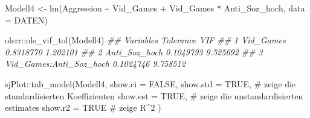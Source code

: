\documentclass[
  10pt,
  letterpaper,
  a4paper, twoside]{scrreprt}
\newenvironment{Shaded}{\begin{snugshade}}{\end{snugshade}}
\newcommand{\AttributeTok}[1]{\textcolor[rgb]{0.40,0.45,0.13}{#1}}
\newcommand{\CommentTok}[1]{\textcolor[rgb]{0.37,0.37,0.37}{#1}}
\newcommand{\ConstantTok}[1]{\textcolor[rgb]{0.56,0.35,0.01}{#1}}
\newcommand{\DocumentationTok}[1]{\textcolor[rgb]{0.37,0.37,0.37}{\textit{#1}}}
\newcommand{\FunctionTok}[1]{\textcolor[rgb]{0.28,0.35,0.67}{#1}}
\newcommand{\NormalTok}[1]{\textcolor[rgb]{0.00,0.23,0.31}{#1}}
\newcommand{\OtherTok}[1]{\textcolor[rgb]{0.00,0.23,0.31}{#1}}
\newcommand{\SpecialCharTok}[1]{\textcolor[rgb]{0.37,0.37,0.37}{#1}}
\begin{document}
\begin{Shaded}
\begin{Highlighting}[]

\NormalTok{Modell4 }\OtherTok{\textless{}{-}} \FunctionTok{lm}\NormalTok{(Aggression }\SpecialCharTok{\textasciitilde{}}\NormalTok{ Vid\_Games }\SpecialCharTok{+}\NormalTok{ Vid\_Games }\SpecialCharTok{*}\NormalTok{ Anti\_Soz\_hoch, }\AttributeTok{data =}\NormalTok{ DATEN)}

\NormalTok{olsrr}\SpecialCharTok{::}\FunctionTok{ols\_vif\_tol}\NormalTok{(Modell4)}
\DocumentationTok{\#\#                 Variables Tolerance      VIF}
\DocumentationTok{\#\# 1               Vid\_Games 0.8318770 1.202101}
\DocumentationTok{\#\# 2           Anti\_Soz\_hoch 0.1049793 9.525692}
\DocumentationTok{\#\# 3 Vid\_Games:Anti\_Soz\_hoch 0.1024746 9.758512}

\NormalTok{sjPlot}\SpecialCharTok{::}\FunctionTok{tab\_model}\NormalTok{(Modell4, }
                  \AttributeTok{show.ci =} \ConstantTok{FALSE}\NormalTok{,}
                  \AttributeTok{show.std =} \ConstantTok{TRUE}\NormalTok{, }\CommentTok{\# zeige die standardisierten Koeffizienten}
                  \AttributeTok{show.est =} \ConstantTok{TRUE}\NormalTok{, }\CommentTok{\# zeige die unstandardisierten estimates}
                  \AttributeTok{show.r2 =} \ConstantTok{TRUE} \CommentTok{\# zeige R\^{}2}
\NormalTok{                  )}
\end{Highlighting}
\end{Shaded}
\end{document}
